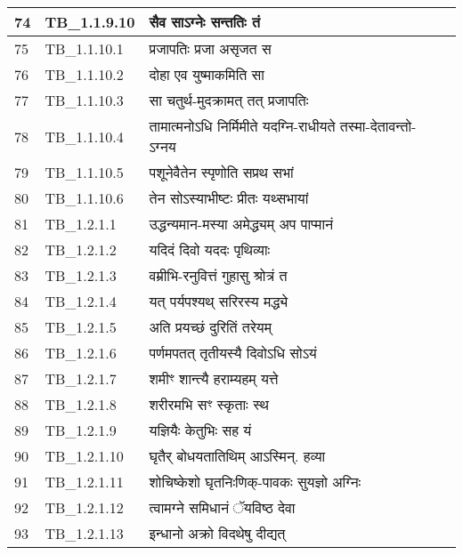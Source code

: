 \documentclass[17pt]{extarticle}
\begin{document}
\begin{longtable}{||p{0.4in}||p{0.9in}||p{4.0in}||p{0.9in}||}
        \hline
            74 & TB\_1.1.9.10 & सैव साऽग्नेः सन्ततिः तं &      \\
        \hline
            75 & TB\_1.1.10.1 & प्रजापतिः प्रजा असृजत स &      \\
        \hline
            76 & TB\_1.1.10.2 & दोहा एव युष्माकमिति सा &      \\
        \hline
            77 & TB\_1.1.10.3 & सा चतुर्थ{-}मुदक्रामत् तत् प्रजापतिः &      \\
        \hline
            78 & TB\_1.1.10.4 & तामात्मनोऽधि निर्मिमीते यदग्नि{-}राधीयते तस्मा{-}देतावन्तो{-}ऽग्नय &      \\
        \hline
            79 & TB\_1.1.10.5 & पशूनेवैतेन स्पृणोति सप्रथ सभां &      \\
        \hline
            80 & TB\_1.1.10.6 & तेन सोऽस्याभीष्टः प्रीतः यथ्सभायां &      \\
        \hline
            81 & TB\_1.2.1.1 & उद्धन्यमान{-}मस्या अमेद्ध्यम् अप पाप्मानं &      \\
        \hline
            82 & TB\_1.2.1.2 & यदिदं दिवो यददः पृथिव्याः &      \\
        \hline
            83 & TB\_1.2.1.3 & वम्रीभि{-}रनुवित्तं गुहासु श्रोत्रं त &      \\
        \hline
            84 & TB\_1.2.1.4 & यत् पर्यपश्यथ् सरिरस्य मद्ध्ये &      \\
        \hline
            85 & TB\_1.2.1.5 & अति प्रयच्छं दुरितिं तरेयम् &      \\
        \hline
            86 & TB\_1.2.1.6 & पर्णमपतत् तृतीयस्यै दिवोऽधि सोऽयं &      \\
        \hline
            87 & TB\_1.2.1.7 & शमीꣳ शान्त्यै हराम्यहम् यत्ते &      \\
        \hline
            88 & TB\_1.2.1.8 & शरीरमभि सꣳ स्कृताः स्थ &      \\
        \hline
            89 & TB\_1.2.1.9 & यज्ञियैः केतुभिः सह यं &      \\
        \hline
            90 & TB\_1.2.1.10 & घृतैर् बोधयतातिथिम् आऽस्मिन्. हव्या &      \\
        \hline
            91 & TB\_1.2.1.11 & शोचिष्केशो घृतनिःणिक्{-}पावकः सुयज्ञो अग्निः &      \\
        \hline
            92 & TB\_1.2.1.12 & त्वामग्ने समिधानं ॅयविष्ठ देवा &      \\
        \hline
            93 & TB\_1.2.1.13 & इन्धानो अक्रो विदथेषु दीद्यत् &      \\
        \hline

\end{longtable}
\end{document}
